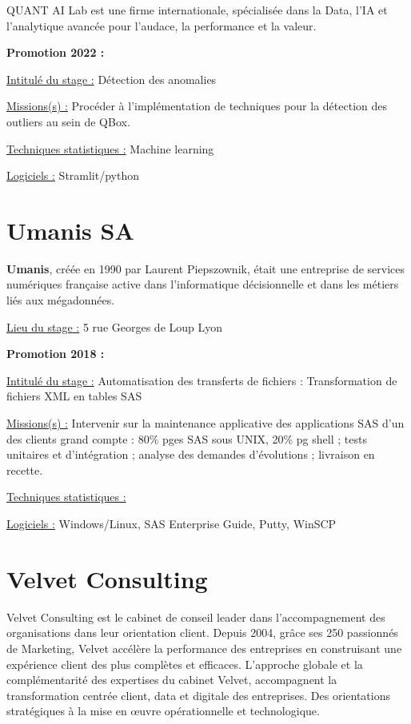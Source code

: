 \documentclass[
  letterpaper,
  DIV=11,
  numbers=noendperiod]{scrreprt}
\begin{document}
QUANT AI Lab est une firme internationale, spécialisée dans la Data,
l'IA et l'analytique avancée pour l'audace, la performance et la valeur.

\textbf{Promotion 2022 :}

\uline{Intitulé du stage :} Détection des anomalies

\uline{Missions(s) :} Procéder à l'implémentation de techniques pour la
détection des outliers au sein de QBox.

\uline{Techniques statistiques :} Machine learning

\uline{Logiciels :} Stramlit/python

\hypertarget{umanis-sa}{%
\section{\texorpdfstring{\textbf{Umanis
SA}}{Umanis SA}}\label{umanis-sa}}

\textbf{Umanis}, créée en 1990 par Laurent Piepszownik, était une
entreprise de services numériques française active dans l'informatique
décisionnelle et dans les métiers liés aux mégadonnées.

\uline{Lieu du stage :} 5 rue Georges de Loup Lyon

\textbf{Promotion 2018 :}

\uline{Intitulé du stage :} Automatisation des transferts de fichiers :
Transformation de fichiers XML en tables SAS

\uline{Missions(s) :} Intervenir sur la maintenance applicative des
applications SAS d'un des clients grand compte : 80\% pges SAS sous
UNIX, 20\% pg shell ; tests unitaires et d'intégration ; analyse des
demandes d'évolutions ; livraison en recette.

\uline{Techniques statistiques :}

\uline{Logiciels :} Windows/Linux, SAS Enterprise Guide, Putty, WinSCP

\hypertarget{velvet-consulting}{%
\section{\texorpdfstring{\textbf{Velvet
Consulting}}{Velvet Consulting}}\label{velvet-consulting}}

Velvet Consulting est le cabinet de conseil leader dans l'accompagnement
des organisations dans leur orientation client. Depuis 2004, grâce ses
250 passionnés de Marketing, Velvet accélère la performance des
entreprises en construisant une expérience client des plus complètes et
efficaces. L'approche globale et la complémentarité des expertises du
cabinet Velvet, accompagnent la transformation centrée client, data et
digitale des entreprises. Des orientations stratégiques à la mise en
œuvre opérationnelle et technologique.
\end{document}
